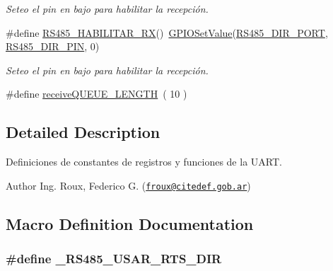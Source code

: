 \begin{DoxyCompactItemize}
\begin{DoxyCompactList}\small\item\em Seteo el pin en bajo para habilitar la recepción. \end{DoxyCompactList}\item 
\#define \hyperlink{group___d_e_f_i_n_e_s_u_a_r_t_ga32978f6a50d8f84d883b95c39df21da2}{R\+S485\+\_\+\+H\+A\+B\+I\+L\+I\+T\+A\+R\+\_\+\+RX}()~\hyperlink{gpio_8h_a6e2440fb6429a69f1338b51a4cab2921}{G\+P\+I\+O\+Set\+Value}(\hyperlink{group___d_e_f_i_n_e_s_u_a_r_t_gac83cc62ddf027024055e8b2ddbfb14d8}{R\+S485\+\_\+\+D\+I\+R\+\_\+\+P\+O\+RT}, \hyperlink{group___d_e_f_i_n_e_s_u_a_r_t_ga0c3dd11efc19d493e0776ae590a342fd}{R\+S485\+\_\+\+D\+I\+R\+\_\+\+P\+IN}, 0)
\begin{DoxyCompactList}\small\item\em Seteo el pin en bajo para habilitar la recepción. \end{DoxyCompactList}\item 
\#define \hyperlink{group___d_e_f_i_n_e_s_u_a_r_t_gad3c62ebbc4b69ec10a8e68be7f85fb1e}{receive\+Q\+U\+E\+U\+E\+\_\+\+L\+E\+N\+G\+TH}~( 10 )
\end{DoxyCompactItemize}


\subsection{Detailed Description}
Definiciones de constantes de registros y funciones de la U\+A\+RT. 

\begin{DoxyAuthor}{Author}
Ing. Roux, Federico G. (\href{mailto:froux@citedef.gob.ar}{\tt froux@citedef.\+gob.\+ar}) 
\end{DoxyAuthor}


\subsection{Macro Definition Documentation}
\subsubsection[{\texorpdfstring{\+\_\+\+R\+S485\+\_\+\+U\+S\+A\+R\+\_\+\+R\+T\+S\+\_\+\+D\+IR}{_RS485_USAR_RTS_DIR}}]{\setlength{\rightskip}{0pt plus 5cm}\#define \+\_\+\+R\+S485\+\_\+\+U\+S\+A\+R\+\_\+\+R\+T\+S\+\_\+\+D\+IR}\hypertarget{group___d_e_f_i_n_e_s_u_a_r_t_ga15fcd73e7add5fb7be07914dcf174eda}{}\label{group___d_e_f_i_n_e_s_u_a_r_t_ga15fcd73e7add5fb7be07914dcf174eda}



